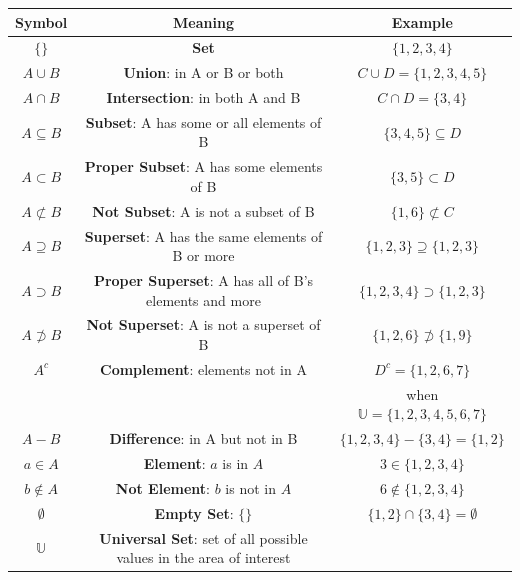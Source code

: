 \documentclass{article}
\begin{document}
            \begin{center}
                \begin{tabular}{|c|c|c|}
                    \hline
                    \textbf{Symbol} & \textbf{Meaning} & \textbf{Example} \\\hline
                    $\{ \}$ & \textbf{Set} & $\{1,2,3,4\}$ \\ \hline
                    $A \cup B$ & \textbf{Union}: in A or B or both & $C\cup D=\{1,2,3,4,5\}$ \\ \hline
                    $A\cap B$ & \textbf{Intersection}: in both A and B & $C\cap D=\{3,4\}$ \\ \hline
                    $A\subseteq B$ & \textbf{Subset}: A has some or all elements of B & $\{3,4,5\}\subseteq D$ \\ \hline
                    $A\subset B$ & \textbf{Proper Subset}: A has some elements of B & $\{3,5\}\subset D$ \\ \hline
                    $A\not\subset B$ & \textbf{Not Subset}: A is not a subset of B & $\{ 1,6 \} \not\subset C$ \\ \hline
                    $A\supseteq B$ & \textbf{Superset}: A has the same elements of B or more & $\{1,2,3\}\supseteq \{1,2,3\}$ \\ \hline
                    $A \supset B$ & \textbf{Proper Superset}: A has all of B's elements and more & $\{1,2,3,4\} \supset \{1,2,3\}$ \\ \hline
                    $A \not\supset B$ & \textbf{Not Superset}: A is not a superset of B & $\{1,2,6\} \not\supset \{1,9\}$ \\ \hline
                    $A^c$ & \textbf{Complement}: elements not in A & $D^c=\{1,2,6,7\}$  \\
                    & & when $\mathbb{U}=\{1,2,3,4,5,6,7\}$ \\ \hline
                    $A-B$ & \textbf{Difference}: in A but not in B & $\{1,2,3,4\}-\{3,4\}=\{1,2\}$ \\ \hline
                    $a \in A$ & \textbf{Element}: $a$ is in $A$ & $3 \in \{1,2,3,4\}$ \\ \hline
                    $b \notin A$ & \textbf{Not Element}: $b$ is not in $A$ & $6 \notin \{1,2,3,4\}$ \\ \hline
                    $\emptyset$ & \textbf{Empty Set}: $\{\}$ & $\{1,2\} \cap\{3,4\}=\emptyset$ \\ \hline
                    $\mathbb{U}$ & \textbf{Universal Set}: set of all possible values in the area of interest &   \\ \hline

\end{tabular}
\end{center}
\end{document}
